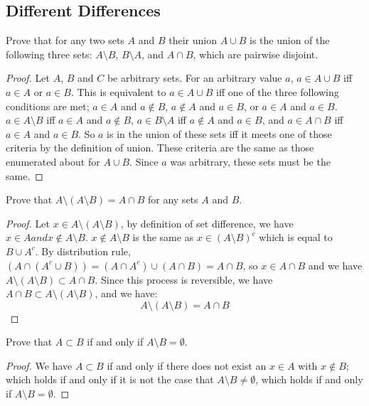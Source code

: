 \subsection{Different Differences}%
			\begin{minorEx}%
            Prove that for any two sets $A$ and $B$ their union $A \cup B$ is the union of the following three sets: $A \setminus B$, $B \setminus A$, and $A \cap B$, which are pairwise disjoint.
            \begin{proof}Let $A$, $B$ and $C$ be arbitrary sets. For an arbitrary value $a$, $a \in A \cup B$ iff $a \in A$ or $a \in B$. This is equivalent to $a \in A \cup B$ iff one of the three following conditions are met; $a \in A$ and $a \not \in B$, $a \not \in A$ and $a \in B$, or $a \in A$ and $a \in B$. \newline $a \in A \setminus B$ iff $a \in A$ and $a \not \in B$, $a \in B \setminus A$ iff $a \not \in A$ and $a \in B$, and $a \in A \cap B$ iff $a \in A$ and $a \in B$. So $a$ is in the union of these sets iff it meets one of those criteria by the definition of union. These criteria are the same as those enumerated about for $A \cup B$. Since $a$ was arbitrary, these sets must be the same.
            
            \end{proof}
            \end{minorEx}
            \begin{minorEx} %
            Prove that $A \setminus (A \setminus B) = A \cap B$ for any sets $A$ and $B$.
            \begin{proof}
            Let $x \in A \setminus (A \setminus B)$, by definition of set difference, we have $x \in A and x \not\in A \setminus B$. $x \not\in A \setminus B$ is the same as $x \in  (A \setminus B)^c$ which is equal to $B \cup A^c$. By distribution rule, $(A \cap (A^c \cup B)) = (A \cap A^c) \cup (A \cap B) = A \cap B$, so $x \in A \cap B$ and we have $A \setminus (A \setminus B) \subset A \cap B$. Since this process is reversible, we have $A \cap B  \subset A \setminus (A \setminus B)$, and we have: $$A \setminus (A \setminus B) = A \cap B$$
            \end{proof}
            \end{minorEx}

            \begin{minorEx} %
            Prove that $A \subset B$ if and only if $A \setminus B = \emptyset$.
            \end{minorEx}
            \begin{proof}
            We have $A \subset B$ if and only if there does not exist an $x \in A$ with $x \notin B$; which holds if and only if it is not the case that $A \setminus B \ne \emptyset$, which holds if and only if $A \setminus B = \emptyset$.
			\end{proof}
            
